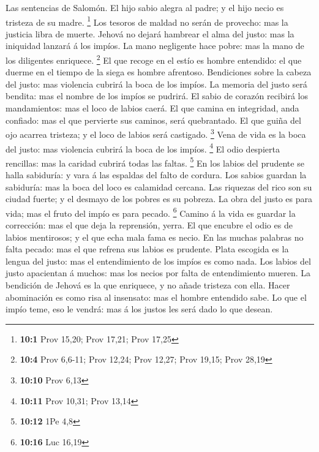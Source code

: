  Las sentencias de Salomón. El hijo sabio alegra al padre; y
el hijo necio es tristeza de su madre. \footnote{\textbf{10:1} Prov
  15,20; Prov 17,21; Prov 17,25}  Los tesoros de maldad no
serán de provecho: mas la justicia libra de muerte.  Jehová
no dejará hambrear el alma del justo: mas la iniquidad lanzará á los
impíos.  La mano negligente hace pobre: mas la mano de los
diligentes enriquece. \footnote{\textbf{10:4} Prov 6,6-11; Prov 12,24;
  Prov 12,27; Prov 19,15; Prov 28,19}  El que recoge en el
estío es hombre entendido: el que duerme en el tiempo de la siega es
hombre afrentoso.  Bendiciones sobre la cabeza del justo:
mas violencia cubrirá la boca de los impíos.  La memoria del
justo será bendita: mas el nombre de los impíos se pudrirá. 
El sabio de corazón recibirá los mandamientos: mas el loco de labios
caerá.  El que camina en integridad, anda confiado: mas el
que pervierte sus caminos, será quebrantado.  El que guiña
del ojo acarrea tristeza; y el loco de labios será castigado.
\footnote{\textbf{10:10} Prov 6,13}  Vena de vida es la
boca del justo: mas violencia cubrirá la boca de los impíos. \footnote{\textbf{10:11}
  Prov 10,31; Prov 13,14}  El odio despierta rencillas: mas
la caridad cubrirá todas las faltas. \footnote{\textbf{10:12} 1Pe 4,8}
 En los labios del prudente se halla sabiduría: y vara á
las espaldas del falto de cordura.  Los sabios guardan la
sabiduría: mas la boca del loco es calamidad cercana.  Las
riquezas del rico son su ciudad fuerte; y el desmayo de los pobres es su
pobreza.  La obra del justo es para vida; mas el fruto del
impío es para pecado. \footnote{\textbf{10:16} Luc 16,19} 
Camino á la vida es guardar la corrección: mas el que deja la
reprensión, yerra.  El que encubre el odio es de labios
mentirosos; y el que echa mala fama es necio.  En las
muchas palabras no falta pecado: mas el que refrena sus labios es
prudente.  Plata escogida es la lengua del justo: mas el
entendimiento de los impíos es como nada.  Los labios del
justo apacientan á muchos: mas los necios por falta de entendimiento
mueren.  La bendición de Jehová es la que enriquece, y no
añade tristeza con ella.  Hacer abominación es como risa al
insensato: mas el hombre entendido sabe.  Lo que el impío
teme, eso le vendrá: mas á los justos les será dado lo que desean.
